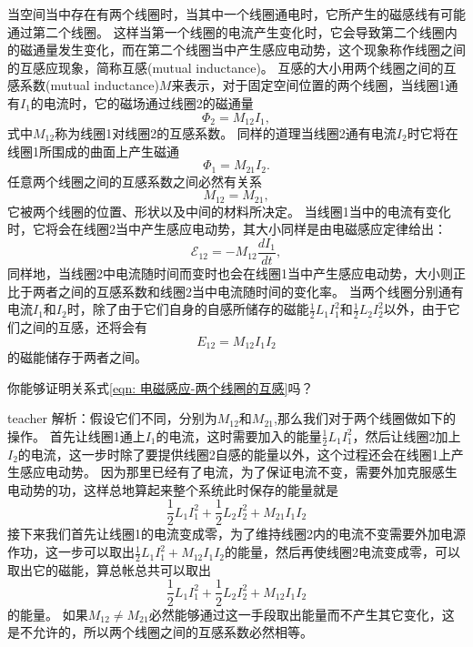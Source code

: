 当空间当中存在有两个线圈时，当其中一个线圈通电时，它所产生的磁感线有可能通过第二个线圈。
这样当第一个线圈的电流产生变化时，它会导致第二个线圈内的磁通量发生变化，而在第二个线圈当中产生感应电动势，这个现象称作线圈之间的互感应现象，简称{\heiti 互感}(mutual inductance)。
互感的大小用两个线圈之间的{\heiti 互感系数}(mutual inductance)$M$来表示，对于固定空间位置的两个线圈，当线圈1通有$I_1$的电流时，它的磁场通过线圈2的磁通量
\begin{equation}
\Phi_2 = M_{12}I_1,
\end{equation}
式中$M_{12}$称为线圈1对线圈2的互感系数。
同样的道理当线圈2通有电流$I_2$时它将在线圈1所围成的曲面上产生磁通
\begin{equation}
\Phi_1 = M_{21}I_2.
\end{equation}
任意两个线圈之间的互感系数之间必然有关系
\begin{equation}\label{eqn: 电磁感应-两个线圈的互感}
M_{12}=M_{21},
\end{equation}
它被两个线圈的位置、形状以及中间的材料所决定。
当线圈1当中的电流有变化时，它将会在线圈2当中产生感应电动势，其大小同样是由电磁感应定律给出：
\begin{equation}
\mathcal{E}_{12} = -M_{12}\frac{dI_1}{dt},
\end{equation}
同样地，当线圈2中电流随时间而变时也会在线圈1当中产生感应电动势，大小则正比于两者之间的互感系数和线圈2当中电流随时间的变化率。
当两个线圈分别通有电流$I_1$和$I_2$时，除了由于它们自身的自感所储存的磁能$\frac{1}{2}L_1I_1^2$和$\frac{1}{2}L_2I_2^2$以外，由于它们之间的互感，还将会有
\begin{equation}
E_{12}=M_{12}I_1I_2
\end{equation}
的磁能储存于两者之间。

\begin{example}
你能够证明关系式\ref{eqn: 电磁感应-两个线圈的互感}吗？
\begin{taggedblock}{teacher}
\newline
解析：假设它们不同，分别为$M_{12}$和$M_{21}$,那么我们对于两个线圈做如下的操作。
首先让线圈1通上$I_1$的电流，这时需要加入的能量$\frac{1}{2}L_1I_1^2$，然后让线圈2加上$I_2$的电流，这一步时除了要提供线圈2自感的能量以外，这个过程还会在线圈1上产生感应电动势。
因为那里已经有了电流，为了保证电流不变，需要外加克服感生电动势的功，这样总地算起来整个系统此时保存的能量就是
\[
\frac{1}{2}L_1I_1^2+\frac{1}{2}L_2I_2^2+M_{21}I_1I_2
\]
接下来我们首先让线圈1的电流变成零，为了维持线圈2内的电流不变需要外加电源作功，这一步可以取出$\frac{1}{2}L_1I_1^2+M_{12}I_1I_2$的能量，然后再使线圈2电流变成零，可以取出它的磁能，算总帐总共可以取出
\[
\frac{1}{2}L_1I_1^2+\frac{1}{2}L_2I_2^2+M_{12}I_1I_2
\]
的能量。
如果$M_{12}\neq M_{21}$必然能够通过这一手段取出能量而不产生其它变化，这是不允许的，所以两个线圈之间的互感系数必然相等。
\end{taggedblock}
\end{example}

